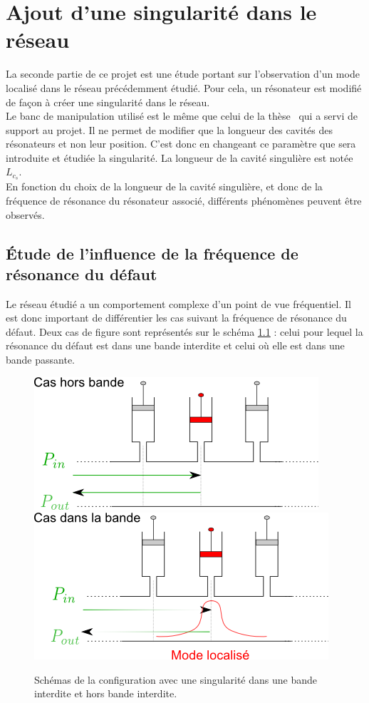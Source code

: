 \chapter{Ajout d'une singularité dans le réseau}
La seconde partie de ce projet est une étude portant sur l'observation d'un mode localisé dans le réseau précédemment étudié. Pour cela, un résonateur est modifié de façon à créer une singularité dans le réseau. \\


Le banc de manipulation utilisé est le même que celui de la thèse~\cite{these_richoux} qui a servi de support au projet. Il ne permet de modifier que la longueur des cavités des résonateurs et non leur position. C'est donc en changeant ce paramètre que sera introduite et étudiée la singularité. La longueur de la cavité singulière est notée $L_{c_{s}}$.\\

En fonction du choix de la longueur de la cavité singulière, et donc de la fréquence de résonance du résonateur associé, différents phénomènes peuvent être observés. 

\section{Étude de l'influence de la fréquence de résonance du défaut}
Le réseau étudié a un comportement complexe d'un point de vue fréquentiel. Il est donc important de différentier les cas suivant la fréquence de résonance du défaut. Deux cas de figure sont représentés sur le schéma \ref{schema_singu1} : celui pour lequel la résonance du défaut est dans une bande interdite et celui où elle est dans une bande passante.

\begin{figure}[!h]
\centering
\includegraphics[scale=0.5]{images_chp2/schema_singu1.png} \hfill
\includegraphics[scale=0.5]{images_chp2/schema_singu2.png}
\caption{\label{schema_singu1} Schémas de la configuration avec une singularité dans une bande interdite  et hors bande interdite.}
\end{figure}




